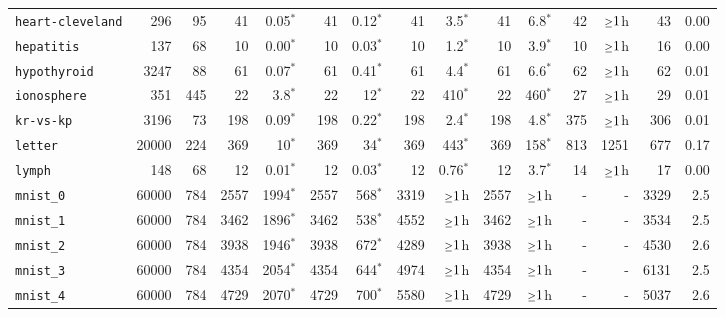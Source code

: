 \begin{tabular}{lccrrrrrrrrrrrr}
\texttt{heart-cleveland} & \multicolumn{1}{r}{296} & \multicolumn{1}{r}{95}  & 41 & 0.05$^*$ & 41 & 0.12$^*$ & 41 & 3.5$^*$ & 41 & 6.8$^*$ & 42 & $\mathsmaller{\geq}1$h & 43 & 0.00\\
\texttt{hepatitis} & \multicolumn{1}{r}{137} & \multicolumn{1}{r}{68}  & 10 & 0.00$^*$ & 10 & 0.03$^*$ & 10 & 1.2$^*$ & 10 & 3.9$^*$ & 10 & $\mathsmaller{\geq}1$h & 16 & 0.00\\
\texttt{hypothyroid} & \multicolumn{1}{r}{3247} & \multicolumn{1}{r}{88}  & 61 & 0.07$^*$ & 61 & 0.41$^*$ & 61 & 4.4$^*$ & 61 & 6.6$^*$ & 62 & $\mathsmaller{\geq}1$h & 62 & 0.01\\
\texttt{ionosphere} & \multicolumn{1}{r}{351} & \multicolumn{1}{r}{445}  & 22 & 3.8$^*$ & 22 & 12$^*$ & 22 & 410$^*$ & 22 & 460$^*$ & 27 & $\mathsmaller{\geq}1$h & 29 & 0.01\\
\texttt{kr-vs-kp} & \multicolumn{1}{r}{3196} & \multicolumn{1}{r}{73}  & 198 & 0.09$^*$ & 198 & 0.22$^*$ & 198 & 2.4$^*$ & 198 & 4.8$^*$ & 375 & $\mathsmaller{\geq}1$h & 306 & 0.01\\
\texttt{letter} & \multicolumn{1}{r}{20000} & \multicolumn{1}{r}{224}  & 369 & 10$^*$ & 369 & 34$^*$ & 369 & 443$^*$ & 369 & 158$^*$ & 813 & 1251 & 677 & 0.17\\
\texttt{lymph} & \multicolumn{1}{r}{148} & \multicolumn{1}{r}{68}  & 12 & 0.01$^*$ & 12 & 0.03$^*$ & 12 & 0.76$^*$ & 12 & 3.7$^*$ & 14 & $\mathsmaller{\geq}1$h & 17 & 0.00\\
\texttt{mnist\_0} & \multicolumn{1}{r}{60000} & \multicolumn{1}{r}{784}  & 2557 & 1994$^*$ & 2557 & 568$^*$ & 3319 & $\mathsmaller{\geq}1$h & 2557 & $\mathsmaller{\geq}1$h & - & - & 3329 & 2.5\\
\texttt{mnist\_1} & \multicolumn{1}{r}{60000} & \multicolumn{1}{r}{784}  & 3462 & 1896$^*$ & 3462 & 538$^*$ & 4552 & $\mathsmaller{\geq}1$h & 3462 & $\mathsmaller{\geq}1$h & - & - & 3534 & 2.5\\
\texttt{mnist\_2} & \multicolumn{1}{r}{60000} & \multicolumn{1}{r}{784}  & 3938 & 1946$^*$ & 3938 & 672$^*$ & 4289 & $\mathsmaller{\geq}1$h & 3938 & $\mathsmaller{\geq}1$h & - & - & 4530 & 2.6\\
\texttt{mnist\_3} & \multicolumn{1}{r}{60000} & \multicolumn{1}{r}{784}  & 4354 & 2054$^*$ & 4354 & 644$^*$ & 4974 & $\mathsmaller{\geq}1$h & 4354 & $\mathsmaller{\geq}1$h & - & - & 6131 & 2.5\\
\texttt{mnist\_4} & \multicolumn{1}{r}{60000} & \multicolumn{1}{r}{784}  & 4729 & 2070$^*$ & 4729 & 700$^*$ & 5580 & $\mathsmaller{\geq}1$h & 4729 & $\mathsmaller{\geq}1$h & - & - & 5037 & 2.6\\

\end{tabular}
